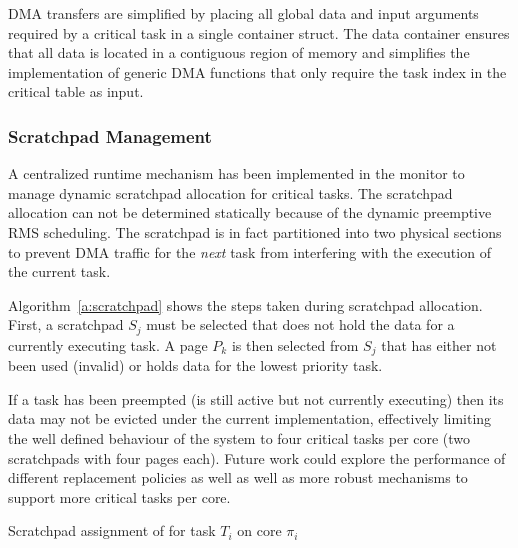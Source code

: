 DMA transfers are simplified by placing all global data and input arguments required by a critical task in a single container struct. 
The data container ensures that all data is located in a contiguous region of memory and simplifies the implementation of generic DMA functions that only require the task index in the critical table as input.


\subsubsection{Scratchpad Management}
\label{s:scratchpad}

	A centralized runtime mechanism has been implemented in the monitor to manage dynamic scratchpad allocation for critical tasks.
	The scratchpad allocation can not be determined statically because of the dynamic preemptive RMS scheduling. 
	The scratchpad is in fact partitioned into two physical sections to prevent DMA traffic for the \emph{next} task from interfering with the execution of the current task. 
	
	Algorithm~\ref{a:scratchpad} shows the steps taken during scratchpad allocation. 
	First, a scratchpad $S_j$ must be selected that does not hold the data for a currently executing task. 
	A page $P_k$ is then selected from $S_j$ that has either not been used (invalid) or holds data for the lowest priority task.

	If a task has been preempted (is still active but not currently executing) then its data may not be evicted under the current implementation, effectively limiting the well defined behaviour of the system to four critical tasks per core (two scratchpads with four pages each).
	Future work could explore the performance of different replacement policies as well as well as more robust mechanisms to support more critical tasks per core.
	
\begin{algorithm}
\caption{Scratchpad assignment of for task $T_i$ on core $\pi_i$}
\label{a:scratchpad}
\end{algorithm}

